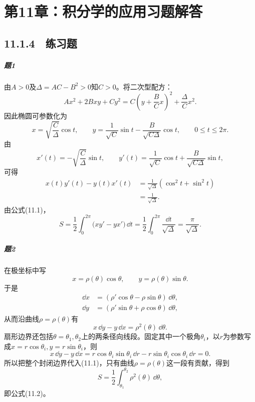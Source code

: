 
\chapter*{第11章：积分学的应用习题解答}
\section*{11.1.4　练习题}

\paragraph{题1}
\begin{xsolution}
由$A>0$及$\Delta=AC-B^2>0$知$C>0$。将二次型配方：
\[
 Ax^2+2Bxy+Cy^2
 =C\left(y+\frac BCx\right)^2+\frac{\Delta}{C}x^2.
\]
因此椭圆可参数化为
\[
 x=\sqrt{\frac C\Delta}\cos t,\qquad
 y=\frac1{\sqrt C}\sin t-\frac{B}{\sqrt{C\Delta}}\cos t,\qquad 0\le t\le2\pi.
\]
由
\[
 x'(t)=-\sqrt{\frac C\Delta}\sin t,
 \qquad
 y'(t)=\frac1{\sqrt C}\cos t+
 \frac{B}{\sqrt{C\Delta}}\sin t,
\]
可得
\begin{align*}
x(t)y'(t)-y(t)x'(t)
&=\frac1{\sqrt\Delta}(\cos^2t+\sin^2t)\\
&=\frac1{\sqrt\Delta}.
\end{align*}
由公式(11.1)，
\[
 S=\frac12\int_0^{2\pi}\bigl(xy'-yx'\bigr)\,\dd t
 =\frac12\int_0^{2\pi}\frac{\dd t}{\sqrt\Delta}
 =\frac\pi{\sqrt\Delta}.
\]
\end{xsolution}

\paragraph{题2}
\begin{xsolution}
在极坐标中写
\[
 x=\rho(\theta)\cos\theta,\qquad
 y=\rho(\theta)\sin\theta.
\]
于是
\begin{align*}
\dd x&=(\rho'\cos\theta-\rho\sin\theta)\,\dd\theta,\\
\dd y&=(\rho'\sin\theta+\rho\cos\theta)\,\dd\theta,
\end{align*}
从而沿曲线$\rho=\rho(\theta)$有
\[
 x\,\dd y-y\,\dd x
 =\rho^2(\theta)\,\dd\theta.
\]
扇形边界还包括$\theta=\theta_1,\theta_2$上的两条径向线段。固定其中一个极角$\theta_i$，以$r$为参数写成$x=r\cos\theta_i,y=r\sin\theta_i$，则
\[
 x\,\dd y-y\,\dd x
 =r\cos\theta_i\sin\theta_i\,\dd r-r\sin\theta_i\cos\theta_i\,\dd r=0.
\]
所以把整个封闭边界代入(11.1)，只有曲线$\rho=\rho(\theta)$这一段有贡献，得到
\[
 S=\frac12\int_{\theta_1}^{\theta_2}\rho^2(\theta)\,\dd\theta,
\]
即公式(11.2)。
\end{xsolution}

